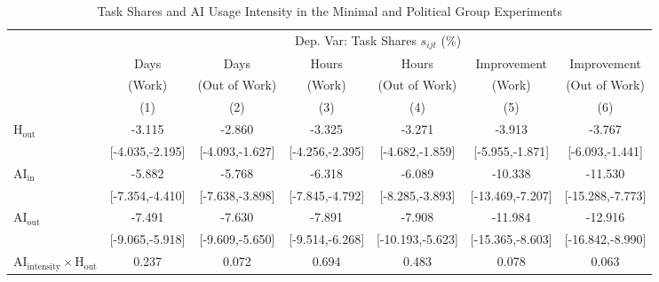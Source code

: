 \begin{table}[H]
\centering
\caption{Task Shares and AI Usage Intensity in the Minimal and Political Group Experiments}
\footnotesize
\begin{threeparttable}
\begin{tabular}{l*{6}{c}}
\toprule\toprule
& \multicolumn{6}{c}{Dep. Var: Task Shares $s_{ijt}$ (\%)} \\
\cmidrule(lr){2-7}
& Days & Days & Hours & Hours & Improvement & Improvement \\
& (Work) & (Out of Work) & (Work) & (Out of Work) & (Work) & (Out of Work) \\
\cmidrule(lr){2-2}\cmidrule(lr){3-3}\cmidrule(lr){4-4}\cmidrule(lr){5-5}\cmidrule(lr){6-6}\cmidrule(lr){7-7}
& (1) & (2) & (3) & (4) & (5) & (6) \\
\midrule
\midrule
$\mathrm{H}_{\text{out}}$&                -3.115\sym{***}&                -2.860\sym{***}&                -3.325\sym{***}&                -3.271\sym{***}&                -3.913\sym{***}&                -3.767\sym{**} \\
            &       [-4.035,-2.195]         &       [-4.093,-1.627]         &       [-4.256,-2.395]         &       [-4.682,-1.859]         &       [-5.955,-1.871]         &       [-6.093,-1.441]         \\
$\mathrm{AI}_{\text{in}}$&                -5.882\sym{***}&                -5.768\sym{***}&                -6.318\sym{***}&                -6.089\sym{***}&               -10.338\sym{***}&               -11.530\sym{***}\\
            &       [-7.354,-4.410]         &       [-7.638,-3.898]         &       [-7.845,-4.792]         &       [-8.285,-3.893]         &      [-13.469,-7.207]         &      [-15.288,-7.773]         \\
$\mathrm{AI}_{\text{out}}$&                -7.491\sym{***}&                -7.630\sym{***}&                -7.891\sym{***}&                -7.908\sym{***}&               -11.984\sym{***}&               -12.916\sym{***}\\
            &       [-9.065,-5.918]         &       [-9.609,-5.650]         &       [-9.514,-6.268]         &      [-10.193,-5.623]         &      [-15.365,-8.603]         &      [-16.842,-8.990]         \\
$\mathrm{AI}_{\text{intensity}} \times \mathrm{H}_{\text{out}}$&                 0.237         &                 0.072         &                 0.694\sym{*}  &                 0.483         &                 0.078         &                 0.063         \\

\end{tabular}
\end{threeparttable}
\end{table}
